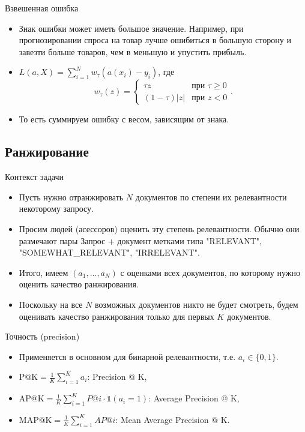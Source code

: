 \documentclass[9pt]{beamer}
\begin{document}
\begin{frame}{Взвешенная ошибка}
    \begin{itemize}
        \item Знак ошибки может иметь большое значение. Например, при прогнозировании спроса на товар лучше ошибиться в большую сторону и завезти больше товаров, чем в меньшую и упустить прибыль.
        \item $L(a, X) = \sum\limits_{i=1}^N w_\tau(a(x_i) - y_i)$, где
    $$w_\tau(z) = \begin{cases}\tau z & \text{при } \tau \geq 0\\ (1-\tau)|z| & \text{при } z <0\end{cases}.$$
    \item То есть суммируем ошибку с весом, зависящим от знака.
    \end{itemize}
\end{frame}

\subsection{Ранжирование}
\begin{frame}{Контекст задачи}
    \begin{itemize}
        \item Пусть нужно отранжировать $N$ документов по степени их релевантности некоторому запросу.
        \item Просим людей (асессоров) оценить эту степень релевантности. Обычно они размечают пары Запрос + документ метками типа "RELEVANT", "SOMEWHAT\_RELEVANT", "IRRELEVANT".
        \item Итого, имеем $(a_1,\ldots, a_N)$ с оценками всех документов, по которому нужно оценить качество ранжирования.
        \item Поскольку на все $N$ возможных документов никто не будет смотреть, будем оценивать качество ранжирования только для первых $K$ документов.
    \end{itemize}
\end{frame}

\begin{frame}{Точность (precision)}
    \begin{itemize}
        \item Применяется в основном для бинарной релевантности, т.е. $a_i\in \{0, 1\}$.
        \item $\text{P@K} = \frac{1}{K}\sum_{i=1}^K a_i$: Precision @ K,
        \item $\text{AP@K} = \frac{1}{K}\sum_{i=1}^K P@i\cdot \mathds{1}(a_i = 1)$: Average Precision @ K,
        \item $\text{MAP@K} = \frac{1}{K}\sum_{i=1}^K AP@i$: Mean Average Precision @ K.
    \end{itemize}
\end{frame}
\end{document}
